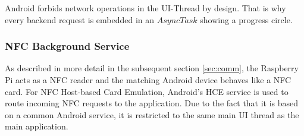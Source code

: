 Android forbids network operations in the UI-Thread by design. That is why every backend request is embedded in an $AsyncTask$ showing a progress circle.

\subsubsection{NFC Background Service}
As described in more detail in the subsequent section \ref{sec:comm}, the Raspberry Pi acts as a NFC reader and the matching Android device behaves like a NFC card.
For NFC Host-based Card Emulation, Android's HCE service is used to route incoming NFC requests to the \app application.
Due to the fact that it is based on a common Android service, it is restricted to the same main UI thread as the main application.

